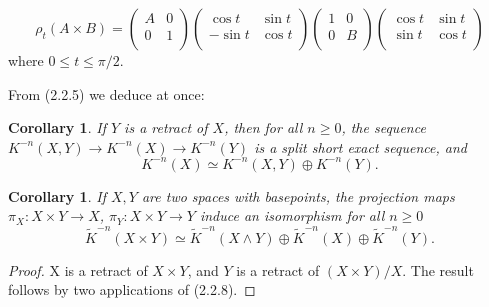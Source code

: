 \documentclass[leqno]{book}
\numberwithin{equation}{section}
\newtheorem{corollary}[theorem]{Corollary}
\theoremstyle{definition}
\begin{document}
            \begin{equation*}
              \rho_{t}(A\times B)=
              \left( \begin{matrix}
                A&		0\\
                0&		1\\
              \end{matrix} \right) \left( \begin{matrix}
                \cos t&		\sin t\\
                -\sin t&		\cos t\\
              \end{matrix} \right) \left( \begin{matrix}
                1&		0\\
                0&		B\\
              \end{matrix} \right) \left( \begin{matrix}
                \cos t&		\sin t\\
                \sin t&		\cos t\\
              \end{matrix} \right) 
            \end{equation*}
            where $0\le t\le \pi/2$.

            From (2.2.5) we deduce at once:

            \begin{corollary}
              If $Y$ is a retract of $X$, then for all $n\ge 0$, the sequence $K^{-n}(X,Y)\to K^{-n}(X)\to K^{-n}(Y)$ is a split short exact sequence, and
              \begin{equation*}
                K^{-n}(X)\simeq K^{-n}(X,Y)\oplus K^{-n}(Y).
              \end{equation*}
            \end{corollary}

            \begin{corollary}
              If $X,Y$ are two spaces with basepoints, the projection maps $\pi_{X}:X\times Y\to X$, $\pi_{Y}:X\times Y\to Y$ induce an isomorphism for all $n\ge 0$
              \begin{equation*}
                \tilde{K}^{-n}(X\times Y)\simeq \tilde{K}^{-n}(X\wedge Y)\oplus \tilde{K}^{-n}(X)\oplus \tilde{K}^{-n}(Y).
              \end{equation*}
            \end{corollary}
            \begin{proof}
              X is a retract of $X\times Y$, and $Y$ is a retract of $(X\times Y)/X$. The result follows by two applications of (2.2.8).
            \end{proof}
\end{document}

